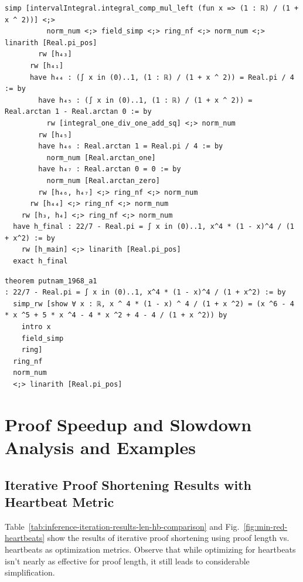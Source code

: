 \begin{tcolorbox}[colback=lightblue, boxrule=0pt, arc=5pt, outer arc=5pt, before skip=0pt, after skip=0pt, boxsep=0pt]
\begin{minipage}[t]{0.99\textwidth}
\begin{lstlisting}[language=lean, breaklines=true, style=mystyletiny]
          simp [intervalIntegral.integral_comp_mul_left (fun x => (1 : ℝ) / (1 + x ^ 2))] <;> 
          norm_num <;> field_simp <;> ring_nf <;> norm_num <;> linarith [Real.pi_pos]
        rw [h₄₃]
      rw [h₄₁]
      have h₄₄ : (∫ x in (0)..1, (1 : ℝ) / (1 + x ^ 2)) = Real.pi / 4 := by
        have h₄₅ : (∫ x in (0)..1, (1 : ℝ) / (1 + x ^ 2)) = Real.arctan 1 - Real.arctan 0 := by
          rw [integral_one_div_one_add_sq] <;> norm_num
        rw [h₄₅]
        have h₄₆ : Real.arctan 1 = Real.pi / 4 := by
          norm_num [Real.arctan_one]
        have h₄₇ : Real.arctan 0 = 0 := by
          norm_num [Real.arctan_zero]
        rw [h₄₆, h₄₇] <;> ring_nf <;> norm_num
      rw [h₄₄] <;> ring_nf <;> norm_num
    rw [h₃, h₄] <;> ring_nf <;> norm_num
  have h_final : 22/7 - Real.pi = ∫ x in (0)..1, x^4 * (1 - x)^4 / (1 + x^2) := by
    rw [h_main] <;> linarith [Real.pi_pos]
  exact h_final
\end{lstlisting}
\end{minipage}

\begin{minipage}[t]{0.99\textwidth}
\begin{lstlisting}[caption={Original Proof (Length 1097) and Simplified Proof (Length 76)},label={lst:examples-tail}, language=lean, breaklines=true, style=mystyle]
theorem putnam_1968_a1
: 22/7 - Real.pi = ∫ x in (0)..1, x^4 * (1 - x)^4 / (1 + x^2) := by
  simp_rw [show ∀ x : ℝ, x ^ 4 * (1 - x) ^ 4 / (1 + x ^2) = (x ^6 - 4 * x ^5 + 5 * x ^4 - 4 * x ^2 + 4 - 4 / (1 + x ^2)) by
    intro x
    field_simp
    ring]
  ring_nf
  norm_num
  <;> linarith [Real.pi_pos]
\end{lstlisting}
\end{minipage}
\end{tcolorbox}

\newpage

\section{Proof Speedup and Slowdown Analysis and Examples} 

\subsection{Iterative Proof Shortening Results with Heartbeat Metric} \label{sec:appendix-heartbeats}

Table~\ref{tab:inference-iteration-results-len-hb-comparison} and Fig.~\ref{fig:min-red-heartbeats} show the results of iterative proof shortening using proof length vs. heartbeats as optimization metrics. Observe that while optimizing for heartbeats isn't nearly as effective for proof length, it still leads to considerable simplification. 

